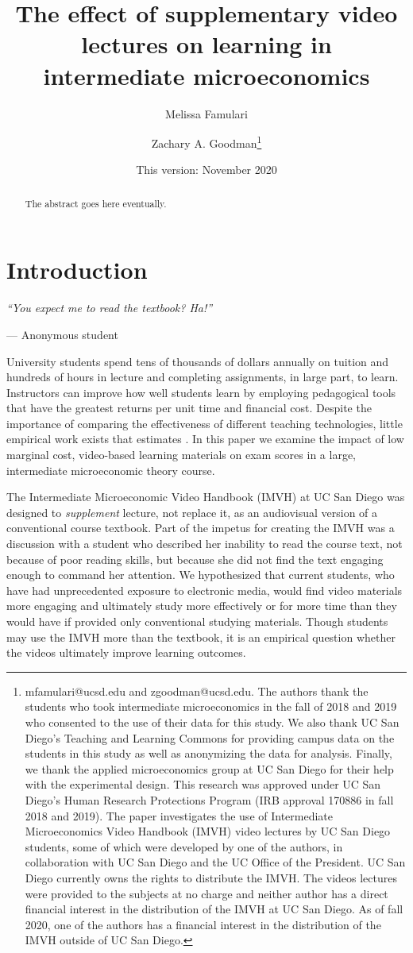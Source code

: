 \documentclass[12pt]{article}
\title{The effect of supplementary video lectures on learning in intermediate microeconomics}
\author{Melissa Famulari}
\author{Zachary A. Goodman\thanks{mfamulari@ucsd.edu and zgoodman@ucsd.edu. The authors thank the students who took intermediate microeconomics in the fall of 2018 and 2019 who consented to the use of their data for this study. We also thank UC San Diego's Teaching and Learning Commons for providing campus data on the students in this study as well as anonymizing the data for analysis. Finally, we thank the applied microeconomics group at UC San Diego for their help with the experimental design. This research was approved under UC San Diego's Human Research Protections Program (IRB approval 170886 in fall 2018 and 2019). The paper investigates the use of Intermediate Microeconomics Video Handbook (IMVH) video lectures by UC San Diego students, some of which were developed by one of the authors, in collaboration with UC San Diego and the UC Office of the President. UC San Diego currently owns the rights to distribute the IMVH. The videos lectures were provided to the subjects at no charge and neither author has a direct financial interest in the distribution of the IMVH at UC San Diego. As of fall 2020, one of the authors has a financial interest in the distribution of the IMVH outside of UC San Diego.}}
\affil{University of California, San Diego}
\date{This version: November 2020} %
\begin{document}
\maketitle
\begin{abstract}
	The abstract goes here eventually.
\end{abstract}

\newpage


\section{Introduction}

\epigraph{\textit{``You expect me to read the textbook? Ha!''}}{--- Anonymous student}\bigskip

University students spend tens of thousands of dollars annually on tuition and hundreds of hours in lecture and completing assignments, in large part, to learn. Instructors can improve how well students learn by employing pedagogical tools that have the greatest returns per unit time and financial cost. Despite the importance of comparing the effectiveness of different teaching technologies, little empirical work exists that estimates . In this paper we examine the impact of low marginal cost, video-based learning materials on exam scores in a large, intermediate microeconomic theory course. %

The Intermediate Microeconomic Video Handbook (IMVH) at UC San Diego was designed to \textit{supplement} lecture, not replace it, as an audiovisual version of a conventional course textbook. Part of the impetus for creating the IMVH was a discussion with a student who described her inability to read the course text, not because of poor reading skills, but because she did not find the text engaging enough to command her attention. We hypothesized that current students, who have had unprecedented exposure to electronic media, would find video materials more engaging and ultimately study more effectively or for more time than they would have if provided only conventional studying materials. Though students may use the IMVH more than the textbook, it is an empirical question whether the videos ultimately improve learning outcomes.
\end{document}
